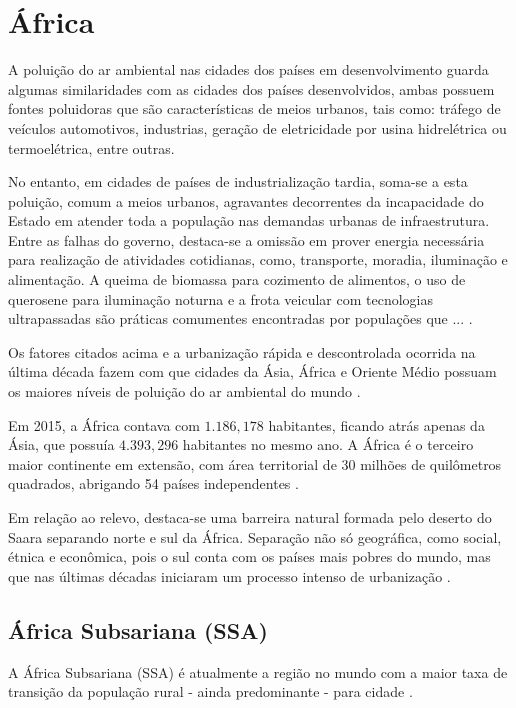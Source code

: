 \section{África}

A poluição do ar ambiental nas cidades dos países em desenvolvimento
guarda algumas similaridades com as cidades dos países desenvolvidos,
ambas possuem fontes poluidoras que são características de meios urbanos, 
tais como: tráfego de veículos automotivos, industrias, geração de 
eletricidade por usina hidrelétrica ou termoelétrica, entre outras. 

No entanto, em cidades de países de industrialização tardia, soma-se a esta 
poluição, comum a meios urbanos, agravantes decorrentes da incapacidade do 
Estado em atender toda a população nas demandas urbanas de infraestrutura. 
Entre as falhas do governo, destaca-se a omissão em prover energia 
necessária para realização de atividades cotidianas, como, transporte, 
moradia, iluminação e alimentação. 
A queima de biomassa para cozimento de alimentos, o uso de querosene para 
iluminação noturna e a frota veicular com tecnologias ultrapassadas são práticas
comumentes encontradas por populações que  ...
\citep{brauer2012}.

Os fatores citados acima e a urbanização rápida e descontrolada ocorrida na
última década fazem com que cidades da Ásia, África e Oriente 
Médio possuam os maiores níveis de poluição do ar ambiental do mundo 
\citep{brauer2012}.

Em 2015, a África contava com $1.186,178$ habitantes, ficando atrás 
apenas da Ásia, que possuía $4.393,296$ habitantes no mesmo ano. 
A África é o terceiro maior continente em extensão, com área territorial 
de 30 milhões de quilômetros quadrados, abrigando 54 países independentes 
\citep{UN}.

Em relação ao relevo, destaca-se uma barreira natural formada pelo deserto do 
Saara separando norte e sul da África. Separação não só geográfica, como
social, étnica e econômica, pois o sul conta com os países mais pobres do mundo, 
mas que nas últimas décadas iniciaram um processo intenso de urbanização 
\citep{UN}. 
   	
\subsection{África Subsariana (SSA)}

A África Subsariana (SSA) é atualmente a região no mundo com a maior 
taxa de transição da população rural - ainda predominante - para cidade
\citep{MONTGOMERY2008}. 

